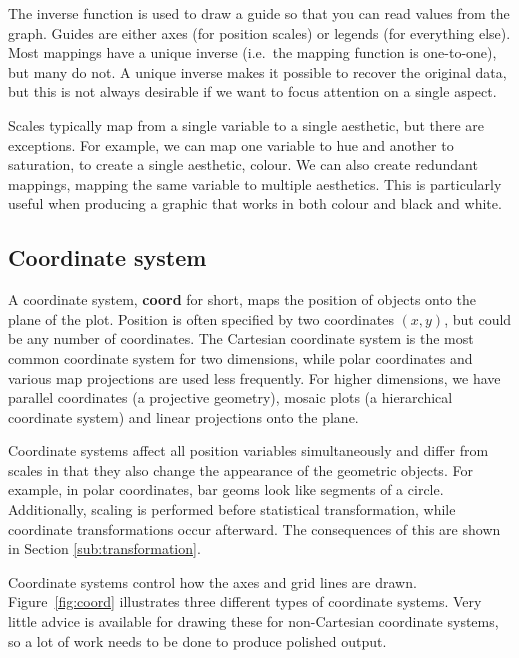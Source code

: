 The inverse function is used to draw a guide so that you can read values from the graph.  Guides are either axes (for position scales) or legends (for everything else).  Most mappings have a unique inverse (i.e.\ the mapping function is one-to-one), but many do not.  A unique inverse makes it possible to recover the original data, but this is not always desirable if we want to focus attention on a single aspect.

Scales typically map from a single variable to a single aesthetic, but there are exceptions.  For example, we can map one variable to hue and another to saturation, to create a single aesthetic, colour.  We can also create redundant mappings, mapping the same variable to multiple aesthetics.  This is particularly useful when producing a graphic that works in both colour and black and white. 

\subsection{Coordinate system}\label{sec:coordinate_systems}

A coordinate system, {\bf coord} for short, maps the position of objects onto the plane of the plot.  Position is often specified by two coordinates $(x, y)$, but could be any number of coordinates.  The Cartesian coordinate system is the most common coordinate system for two dimensions, while polar coordinates and various map projections are used less frequently.  For higher dimensions, we have parallel coordinates (a projective geometry), mosaic plots (a hierarchical coordinate system) and linear projections onto the plane.

Coordinate systems affect all position variables simultaneously and differ from scales in that they also change the appearance of the geometric objects.  For example, in polar coordinates, bar geoms look like segments of a circle.  Additionally, scaling is performed before statistical transformation, while coordinate transformations occur afterward.  The consequences of this are shown in Section \ref{sub:transformation}.

Coordinate systems control how the axes and grid lines are drawn.  Figure~\ref{fig:coord} illustrates three different types of coordinate systems.  Very little advice is available for drawing these for non-Cartesian coordinate systems, so a lot of work needs to be done to produce polished output.


